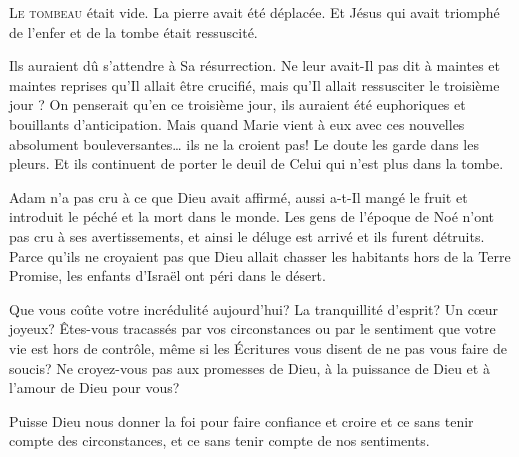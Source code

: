 \dvrule






\lettrine{L}{e tombeau} était vide. La pierre avait été déplacée.
 Et Jésus \ocadr qui avait triomphé de l'enfer et de la tombe \fcadr{}
 était ressuscité.

Ils auraient dû s'attendre à Sa résurrection.
 Ne leur avait-Il pas dit à maintes et maintes reprises
 qu'Il allait être crucifié, mais qu'Il allait ressusciter le troisième jour ?
 On penserait qu'en ce troisième jour, ils auraient été euphoriques
 et bouillants  d'anticipation.
 Mais quand Marie vient à eux avec ces nouvelles absolument
 bouleversantes\dots{} ils ne la croient pas!
 Le doute les garde dans les pleurs. Et ils continuent de porter
 le deuil de Celui qui n'est plus dans la tombe.


Adam n'a pas cru à ce que Dieu avait affirmé, aussi a-t-Il mangé
 le fruit et introduit le péché et la mort dans le monde.
 Les gens de l'époque de Noé n'ont pas cru à ses avertissements,
 et ainsi le déluge est arrivé et ils furent détruits.
 Parce qu'ils ne croyaient pas que Dieu allait chasser les habitants
 hors de la Terre Promise, les enfants d'Israël ont péri dans le désert.

Que vous coûte votre incrédulité aujourd'hui?
 La tranquillité d'esprit? Un c\oe{}ur joyeux?
 Êtes-vous tracassés par vos circonstances ou par le sentiment
 que votre vie est hors de contrôle, même si les Écritures vous disent
 de ne pas vous faire de soucis? Ne croyez-vous pas aux promesses de Dieu,
 à la puissance de Dieu et à l'amour de Dieu pour vous?

Puisse Dieu nous donner la foi pour faire confiance et croire
 \ocadr et ce sans tenir compte des circonstances,
 et ce sans tenir compte de nos sentiments.

\dvrule



